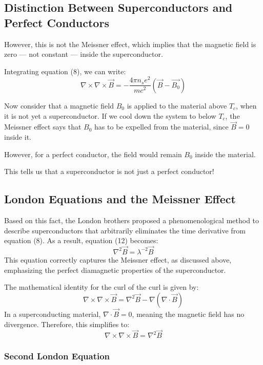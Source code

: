\documentclass{article}
\begin{document}
\subsection{Distinction Between Superconductors and Perfect Conductors}

However, this is not the Meissner effect, which implies that the magnetic field is zero — not constant — inside the superconductor.

Integrating equation (8), we can write:
\[
\nabla \times \nabla \times \vec{B} = - \frac{4 \pi n_s e^2}{mc^2} (\vec{B} - \vec{B_0}) \tag{12}
\]

Now consider that a magnetic field \(B_0\) is applied to the material above \(T_c\), when it is not yet a superconductor. If we cool down the system to below \(T_c\), the Meissner effect says that \(B_0\) has to be expelled from the material, since \(\vec{B} = 0\) inside it. 

However, for a perfect conductor, the field would remain \(B_0\) inside the material.

This tells us that a superconductor is not just a perfect conductor!

\subsection{London Equations and the Meissner Effect}

Based on this fact, the London brothers proposed a phenomenological method to describe superconductors that arbitrarily eliminates the time derivative from equation (8). As a result, equation (12) becomes:
\[
\nabla^2 \vec{B} = \lambda^{-2} \vec{B} \tag{13}
\]
This equation correctly captures the Meissner effect, as discussed above, emphasizing the perfect diamagnetic properties of the superconductor.

\begin{theorem}
    The mathematical identity for the curl of the curl is given by:
\[
\nabla \times \nabla \times \vec{B} = \nabla^2 \vec{B} - \nabla (\nabla \cdot \vec{B})
\]
In a superconducting material, \(\nabla \cdot \vec{B} = 0\), meaning the magnetic field has no divergence. Therefore, this simplifies to:
\[
\nabla \times \nabla \times \vec{B} = \nabla^2 \vec{B}
\]

\end{theorem}

\subsubsection{Second London Equation}
\end{document}

